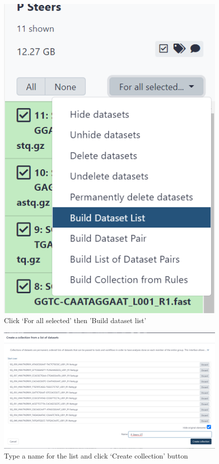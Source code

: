 \documentclass[
]{book}
\begin{document}
\begin{figure}

{\centering \includegraphics[width=6.03in]{images/image006} 

}

\caption{Click ‘For all selected’ then 'Build dataset list'}\label{fig:chunk6}
\end{figure}

\begin{figure}

{\centering \includegraphics[width=1\linewidth]{images/image007} 

}

\caption{Type a name for the list and click ‘Create collection’ button}\label{fig:chunk7}
\end{figure}
\end{document}
